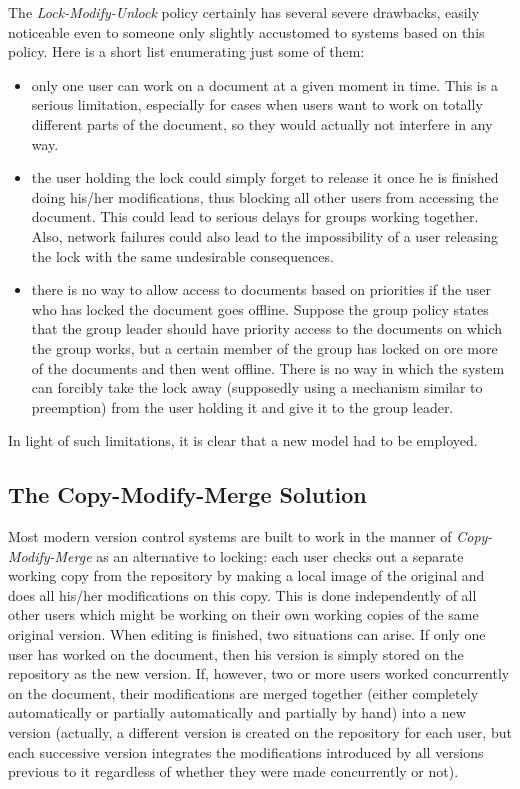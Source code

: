 The \emph{Lock-Modify-Unlock} policy certainly has several severe drawbacks, easily noticeable
even to someone only slightly accustomed to systems based on this policy. Here is a short
list enumerating just some of them:

\begin{itemize}
\item only one user can work on a document at a given moment in time. This is a serious
      limitation, especially for cases when users want to work on totally different parts
      of the document, so they would actually not interfere in any way.
\item the user holding the lock could simply forget to release it once he is finished
      doing his/her modifications, thus blocking all other users from accessing the document.
      This could lead to serious delays for groups working together. Also, network failures
      could also lead to the impossibility of a user releasing the lock with the same
      undesirable consequences.
\item there is no way to allow access to documents based on priorities if the user who has
      locked the document goes offline. Suppose the group policy states that the group leader
      should have priority access to the documents on which the group works, but a certain
      member of the group has locked on ore more of the documents and then went offline. There
      is no way in which the system can forcibly take the lock away (supposedly using a
      mechanism similar to preemption) from the user holding it and give it to the group
      leader.
\end{itemize}

In light of such limitations, it is clear that a new model had to be employed.

\subsection{The Copy-Modify-Merge Solution}
\label{sec:cmm}

Most modern version control systems are built to work in the manner of \emph{Copy-Modify-Merge}
as an alternative to locking: each user checks out a separate working copy from the repository
by making a local image of the original and does all his/her modifications on this copy. This
is done independently of all other users which might be working on their own working copies
of the same original version. When editing is finished, two situations can arise. If only
one user has worked on the document, then his version is simply stored on the repository as
the new version. If, however, two or more users worked concurrently on the document, their
modifications are merged together (either completely automatically or partially automatically
and partially by hand) into a new version (actually, a different version is created on the
repository for each user, but each successive version integrates the modifications introduced
by all versions previous to it regardless of whether they were made concurrently or not).

